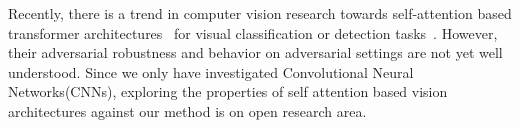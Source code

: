 Recently, there is a trend in computer vision research towards self-attention based transformer architectures~\cite{vaswani2017attention} for visual classification or detection tasks~\cite{dosovitskiy2020image}. However, their adversarial robustness and behavior on adversarial settings are not yet well understood. Since we only have investigated Convolutional Neural Networks(CNNs), exploring the properties of self attention based vision architectures against our method is on open research area.




